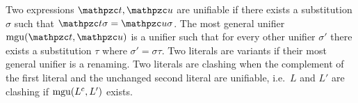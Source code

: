 
\begin{definition}\label{def:unifier}
Two expressions $\mct, \mcu$ are {\myem unifiable} if there exists a substitution $\sigma$ such that $\mct\sigma=\mcu\sigma$.
The {\myem most general unifier} $\mgu(\mct,\mcu)$ is a unifier such that
for every other unifier $\sigma'$ there exists a substitution $\tau$ where
$\sigma' = \sigma \tau$. 
Two literals are variants if their most general unifier is a renaming.
Two literals are {\myem clashing} when the complement of the first literal 
and the unchanged second literal are unifiable, i.e.~$L$ and $L'$ are clashing if $\operatorname{mgu}(L^c, L')$ exists.
\end{definition}